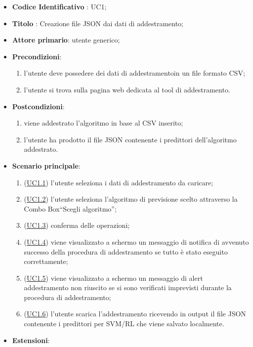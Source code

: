 		\begin{itemize}
			\item\textbf{Codice Identificativo} : UC1;
			\item\textbf{Titolo} : Creazione file JSON dai dati di addestramento;
			\item\textbf{Attore primario}: utente generico;
			\item\textbf{Precondizioni}:
				\begin{enumerate}
					\item l'utente deve possedere dei dati di addestramento\glo in un file formato CSV\glo;
					\item l'utente si trova sulla pagina web dedicata al tool di addestramento.
				\end{enumerate}
			\item\textbf{Postcondizioni}:
				\begin{enumerate}
					\item viene addestrato l'algoritmo in base al CSV inserito;
					\item l'utente ha prodotto il file JSON contenente i predittori dell'algoritmo addestrato.
				\end{enumerate}
			\item\textbf{Scenario principale}:
				\begin{enumerate}
					\item (\hyperref[par:UC1.1]{UC1.1}) l'utente seleziona i dati di addestramento da caricare;
					\item (\hyperref[par:UC1.2]{UC1.2}) l'utente seleziona l'algoritmo di previsione scelto attraverso la Combo Box\glo “Scegli algoritmo”;
					\item (\hyperref[par:UC1.3]{UC1.3}) conferma delle operazioni;
					\item (\hyperref[par:UC1.4]{UC1.4}) viene visualizzato a schermo un messaggio di notifica di avvenuto successo della procedura di addestramento se tutto è stato eseguito correttamente;
					\item (\hyperref[par:UC1.5]{UC1.5}) viene visualizzato a schermo un messaggio di alert addestramento non riuscito se si sono verificati imprevisti durante la procedura di addestramento;
					\item (\hyperref[par:UC1.6]{UC1.6}) l'utente scarica l'addestramento ricevendo in output il file JSON contenente i predittori per SVM/RL che viene salvato localmente.
				\end{enumerate}
			\item\textbf{Estensioni}: 

\end{itemize}
